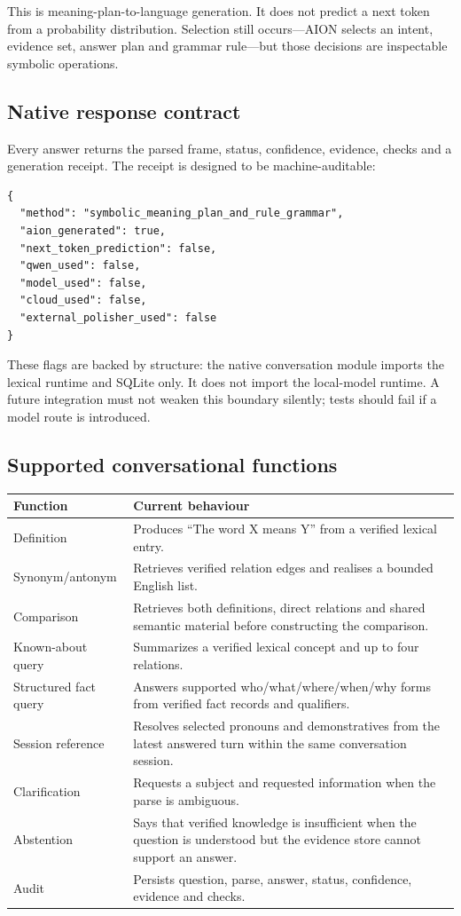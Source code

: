 \documentclass[11pt,a4paper]{article}
\begin{document}
This is meaning-plan-to-language generation. It does not predict a next token from a probability
distribution. Selection still occurs---AION selects an intent, evidence set, answer plan and
grammar rule---but those decisions are inspectable symbolic operations.

\subsection{Native response contract}

Every answer returns the parsed frame, status, confidence, evidence, checks and a generation
receipt. The receipt is designed to be machine-auditable:

\begin{lstlisting}
{
  "method": "symbolic_meaning_plan_and_rule_grammar",
  "aion_generated": true,
  "next_token_prediction": false,
  "qwen_used": false,
  "model_used": false,
  "cloud_used": false,
  "external_polisher_used": false
}
\end{lstlisting}

These flags are backed by structure: the native conversation module imports the lexical
runtime and SQLite only. It does not import the local-model runtime. A future integration must
not weaken this boundary silently; tests should fail if a model route is introduced.

\subsection{Supported conversational functions}

\begin{longtable}{p{} p{}}
\toprule
Function & Current behaviour \\
\midrule
\endhead
Definition & Produces ``The word X means Y'' from a verified lexical entry. \\
Synonym/antonym & Retrieves verified relation edges and realises a bounded English list. \\
Comparison & Retrieves both definitions, direct relations and shared semantic material before
constructing the comparison. \\
Known-about query & Summarizes a verified lexical concept and up to four relations. \\
Structured fact query & Answers supported who/what/where/when/why forms from verified fact
records and qualifiers. \\
Session reference & Resolves selected pronouns and demonstratives from the latest answered turn
within the same conversation session. \\
Clarification & Requests a subject and requested information when the parse is ambiguous. \\
Abstention & Says that verified knowledge is insufficient when the question is understood but
the evidence store cannot support an answer. \\
Audit & Persists question, parse, answer, status, confidence, evidence and checks. \\
\bottomrule
\end{longtable}
\end{document}
